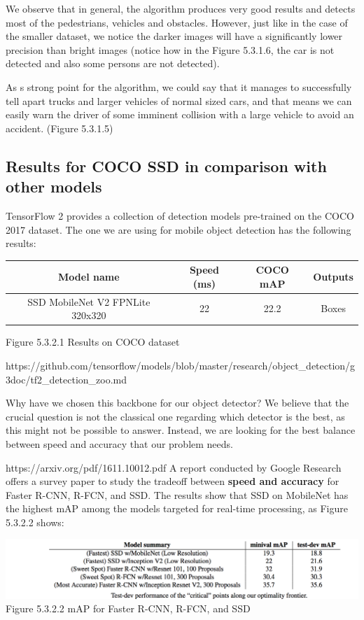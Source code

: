 \documentclass[runningheads,a4paper,11pt]{report}
\begin{document}
 We observe that in general, the algorithm produces very good results and detects most of the pedestrians, vehicles and obstacles.
However, just like in the case of the smaller dataset, we notice the darker images will have a significantly lower precision than bright images (notice how in the Figure 5.3.1.6, the car is not detected and also some persons are not detected).

As s strong point for the algorithm, we could say that it manages to successfully tell apart trucks and larger vehicles of normal sized cars, and that means we can easily warn the driver of some imminent collision with a large vehicle to avoid an accident. (Figure 5.3.1.5)

\subsection{Results for COCO SSD in comparison with other models}
\label{subsection:results_coco}

TensorFlow 2 provides a collection of detection models pre-trained on the COCO 2017 dataset. The one we are using for mobile object detection has the following results:

\begin{center}
\begin{tabular}{||c c c c||} 
 \hline
 Model name & Speed (ms) & COCO mAP & Outputs \\ [0.5ex] 
 \hline\hline
 SSD MobileNet V2 FPNLite 320x320 & 22 & 22.2 & Boxes \\ 
 \hline
\end{tabular}
\end{center}
\begin{center}
Figure 5.3.2.1 Results on COCO dataset
\end{center}

https://github.com/tensorflow/models/blob/master/research/object_detection/g3doc/tf2_detection_zoo.md


Why have we chosen this backbone for our object detector? We believe that the crucial question is not the classical one regarding which detector is the best, as this might not be possible to answer. Instead, we are looking for the best balance between speed and accuracy that our problem needs.  

https://arxiv.org/pdf/1611.10012.pdf
A report conducted by Google Research offers a survey paper to study the tradeoff between \textbf{speed and accuracy} for Faster R-CNN, R-FCN, and SSD. The results show that SSD on MobileNet has the highest mAP among the models targeted for real-time processing, as Figure 5.3.2.2 shows:
\begin{center}
\includegraphics[width=17cm]{images/googleResearch.png}
Figure 5.3.2.2 mAP for Faster R-CNN, R-FCN, and SSD
\end{center}
\end{document}
